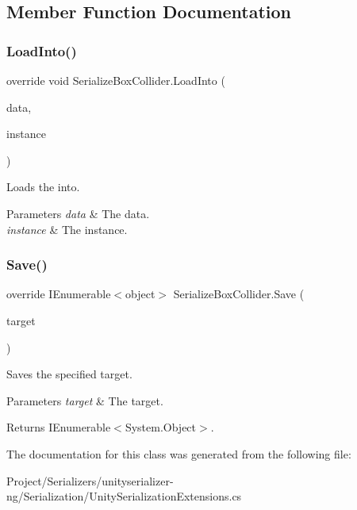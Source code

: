 \subsection{Member Function Documentation}
\mbox{\label{class_serialize_box_collider_a4e2d9de367e71f67ae907db73c2978a7}} 
\subsubsection{\texorpdfstring{Load\+Into()}{LoadInto()}}
{\footnotesize\ttfamily override void Serialize\+Box\+Collider.\+Load\+Into (\begin{DoxyParamCaption}\item[{object \mbox{[}$\,$\mbox{]}}]{data,  }\item[{Box\+Collider}]{instance }\end{DoxyParamCaption})\hspace{0.3cm}{\ttfamily [inline]}}



Loads the into. 


\begin{DoxyParams}{Parameters}
{\em data} & The data.\\
\hline
{\em instance} & The instance.\\
\hline
\end{DoxyParams}
\mbox{\label{class_serialize_box_collider_a221fddae2d26e61cf659f0f684fdec59}} 
\subsubsection{\texorpdfstring{Save()}{Save()}}
{\footnotesize\ttfamily override I\+Enumerable$<$object$>$ Serialize\+Box\+Collider.\+Save (\begin{DoxyParamCaption}\item[{Box\+Collider}]{target }\end{DoxyParamCaption})\hspace{0.3cm}{\ttfamily [inline]}}



Saves the specified target. 


\begin{DoxyParams}{Parameters}
{\em target} & The target.\\
\hline
\end{DoxyParams}
\begin{DoxyReturn}{Returns}
I\+Enumerable$<$System.\+Object$>$.
\end{DoxyReturn}


The documentation for this class was generated from the following file\+:\begin{DoxyCompactItemize}
\item 
Project/\+Serializers/unityserializer-\/ng/\+Serialization/Unity\+Serialization\+Extensions.\+cs\end{DoxyCompactItemize}
